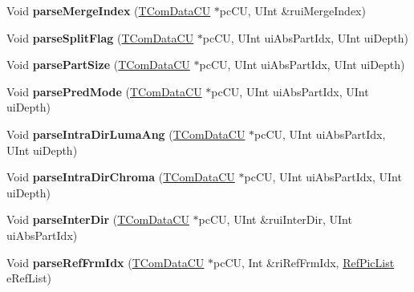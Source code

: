 \begin{DoxyCompactItemize}
\mbox{\label{class_t_dec_cavlc_a938fe9b43a7e18865a920d78118d85a8}} 
Void {\bfseries parse\+Merge\+Index} (\hyperlink{class_t_com_data_c_u}{T\+Com\+Data\+CU} $\ast$pc\+CU, U\+Int \&rui\+Merge\+Index)
\item 
\mbox{\label{class_t_dec_cavlc_a9383b19e6bd962b543d0f0071596f553}} 
Void {\bfseries parse\+Split\+Flag} (\hyperlink{class_t_com_data_c_u}{T\+Com\+Data\+CU} $\ast$pc\+CU, U\+Int ui\+Abs\+Part\+Idx, U\+Int ui\+Depth)
\item 
\mbox{\label{class_t_dec_cavlc_a780d946cae1ac8821f1a250f96e1f4c9}} 
Void {\bfseries parse\+Part\+Size} (\hyperlink{class_t_com_data_c_u}{T\+Com\+Data\+CU} $\ast$pc\+CU, U\+Int ui\+Abs\+Part\+Idx, U\+Int ui\+Depth)
\item 
\mbox{\label{class_t_dec_cavlc_a69f79d2d1efd2a038bf6db23c96236d4}} 
Void {\bfseries parse\+Pred\+Mode} (\hyperlink{class_t_com_data_c_u}{T\+Com\+Data\+CU} $\ast$pc\+CU, U\+Int ui\+Abs\+Part\+Idx, U\+Int ui\+Depth)
\item 
\mbox{\label{class_t_dec_cavlc_a61af8b19c420504c4d1f30434626cd88}} 
Void {\bfseries parse\+Intra\+Dir\+Luma\+Ang} (\hyperlink{class_t_com_data_c_u}{T\+Com\+Data\+CU} $\ast$pc\+CU, U\+Int ui\+Abs\+Part\+Idx, U\+Int ui\+Depth)
\item 
\mbox{\label{class_t_dec_cavlc_acf24ce9f7283022798e25a158ecbc017}} 
Void {\bfseries parse\+Intra\+Dir\+Chroma} (\hyperlink{class_t_com_data_c_u}{T\+Com\+Data\+CU} $\ast$pc\+CU, U\+Int ui\+Abs\+Part\+Idx, U\+Int ui\+Depth)
\item 
\mbox{\label{class_t_dec_cavlc_a4ec7388cf247d4b16d333f084ff8fac3}} 
Void {\bfseries parse\+Inter\+Dir} (\hyperlink{class_t_com_data_c_u}{T\+Com\+Data\+CU} $\ast$pc\+CU, U\+Int \&rui\+Inter\+Dir, U\+Int ui\+Abs\+Part\+Idx)
\item 
\mbox{\label{class_t_dec_cavlc_a7493b902b4c9de1c86f2c168b6a9a040}} 
Void {\bfseries parse\+Ref\+Frm\+Idx} (\hyperlink{class_t_com_data_c_u}{T\+Com\+Data\+CU} $\ast$pc\+CU, Int \&ri\+Ref\+Frm\+Idx, \hyperlink{_type_def_8h_a93cea48eb9dcfd661168dee82e41b384}{Ref\+Pic\+List} e\+Ref\+List)

\end{DoxyCompactItemize}
